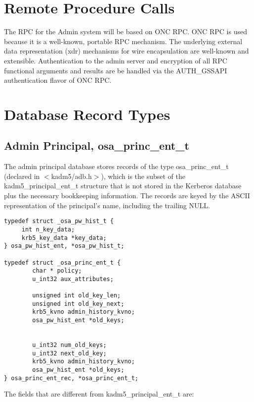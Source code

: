 \section{Remote Procedure Calls}

The RPC for the Admin system will be based on ONC RPC.  ONC RPC is
used because it is a well-known, portable RPC mechanism.  The
underlying external data representation (xdr) mechanisms for wire
encapsulation are well-known and extensible.  Authentication to the
admin server and encryption of all RPC functional arguments and
results are be handled via the AUTH_GSSAPI authentication flavor of
ONC RPC.

\section{Database Record Types}
\label{sec:db-types}

\subsection{Admin Principal, osa_princ_ent_t}

The admin principal database stores records of the type
osa_princ_ent_t (declared in $<$kadm5/adb.h$>$), which is the
subset of the kadm5_principal_ent_t structure that is not stored
in the Kerberos database plus the necessary bookkeeping information.
The records are keyed by the ASCII representation of the principal's
name, including the trailing NULL.

\begin{verbatim}
typedef struct _osa_pw_hist_t {
     int n_key_data;
     krb5_key_data *key_data;
} osa_pw_hist_ent, *osa_pw_hist_t;

typedef struct _osa_princ_ent_t {
        char * policy;
        u_int32 aux_attributes;

        unsigned int old_key_len;
        unsigned int old_key_next;
        krb5_kvno admin_history_kvno;
        osa_pw_hist_ent *old_keys;


        u_int32 num_old_keys;
        u_int32 next_old_key;
        krb5_kvno admin_history_kvno;
        osa_pw_hist_ent *old_keys;
} osa_princ_ent_rec, *osa_princ_ent_t;
\end{verbatim}

The fields that are different from kadm5_principal_ent_t are:


